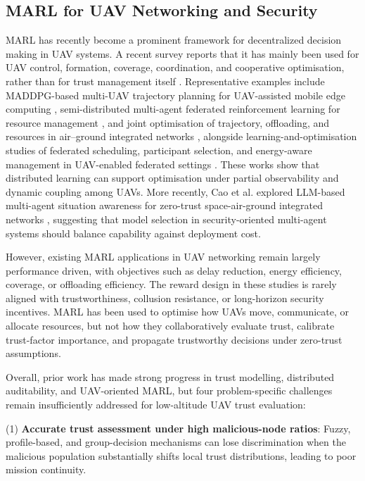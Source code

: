 \documentclass[notspecified,article,submit,moreauthors]{Definitions/mdpi}
\begin{document}
\subsection{MARL for UAV Networking and Security}
MARL has recently become a prominent framework for decentralized decision making in UAV systems. A recent survey reports that it has mainly been used for UAV control, formation, coverage, coordination, and cooperative optimisation, rather than for trust management itself \cite{ekechi2025survey}. Representative examples include MADDPG-based multi-UAV trajectory planning for UAV-assisted mobile edge computing \cite{wang2020trajectory}, semi-distributed multi-agent federated reinforcement learning for resource management \cite{nie2021resource}, and joint optimisation of trajectory, offloading, and resources in air--ground integrated networks \cite{alam2024joint}, alongside learning-and-optimisation studies of federated scheduling, participant selection, and energy-aware management in UAV-enabled federated settings \cite{yang2021ppfluav,lim2021contractfl,wang2023hnpfl,qureshi2024asynfl,jing2023agifl,fu2025energyfl}. These works show that distributed learning can support optimisation under partial observability and dynamic coupling among UAVs. More recently, Cao et al. explored LLM-based multi-agent situation awareness for zero-trust space-air-ground integrated networks \cite{cao2025sagin}, suggesting that model selection in security-oriented multi-agent systems should balance capability against deployment cost.

However, existing MARL applications in UAV networking remain largely performance driven, with objectives such as delay reduction, energy efficiency, coverage, or offloading efficiency. The reward design in these studies is rarely aligned with trustworthiness, collusion resistance, or long-horizon security incentives. MARL has been used to optimise how UAVs move, communicate, or allocate resources, but not how they collaboratively evaluate trust, calibrate trust-factor importance, and propagate trustworthy decisions under zero-trust assumptions.

Overall, prior work has made strong progress in trust modelling, distributed auditability, and UAV-oriented MARL, but four problem-specific challenges remain insufficiently addressed for low-altitude UAV trust evaluation:

(1) \textbf{Accurate trust assessment under high malicious-node ratios}: Fuzzy, profile-based, and group-decision mechanisms can lose discrimination when the malicious population substantially shifts local trust distributions, leading to poor mission continuity.
\end{document}
